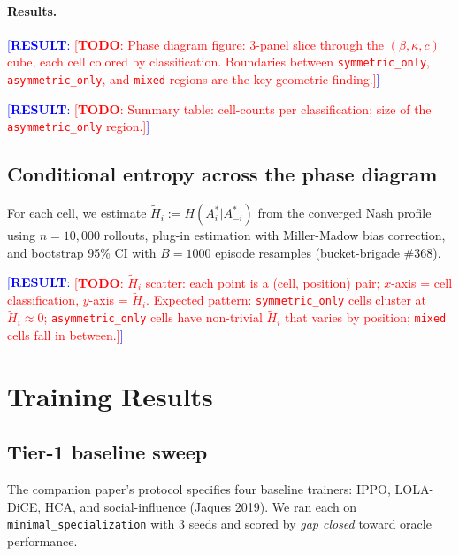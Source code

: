 \documentclass{article}
\newcommand{\TODO}[1]{\textcolor{red}{[\textbf{TODO}: #1]}}
\newcommand{\RESULT}[1]{\textcolor{blue}{[\textbf{RESULT}: #1]}}
\begin{document}
\paragraph{Results.}
\RESULT{\TODO{Phase diagram figure: 3-panel slice through the
$(\beta, \kappa, c)$ cube, each cell colored by classification.  Boundaries
between \texttt{symmetric\_only}, \texttt{asymmetric\_only}, and \texttt{mixed}
regions are the key geometric finding.}}

\RESULT{\TODO{Summary table: cell-counts per classification; size of the
\texttt{asymmetric\_only} region.}}

\subsection{Conditional entropy across the phase diagram}
\label{sec:cond-entropy}

For each cell, we estimate $\tilde{H}_i := H(A_i^*|A_{-i}^*)$ from the
converged Nash profile using $n = 10{,}000$ rollouts, plug-in estimation with
Miller-Madow bias correction, and bootstrap 95\% CI with $B = 1000$ episode
resamples (bucket-brigade
\href{https://github.com/rjwalters/bucket-brigade/issues/368}{\#368}).

\RESULT{\TODO{$\tilde{H}_i$ scatter: each point is a (cell, position) pair;
$x$-axis = cell classification, $y$-axis = $\tilde{H}_i$.  Expected pattern:
\texttt{symmetric\_only} cells cluster at $\tilde{H}_i \approx 0$;
\texttt{asymmetric\_only} cells have non-trivial $\tilde{H}_i$ that varies by
position; \texttt{mixed} cells fall in between.}}

\section{Training Results}
\label{sec:training}

\subsection{Tier-1 baseline sweep}

The companion paper's protocol specifies four baseline trainers: IPPO, LOLA-DiCE,
HCA, and social-influence (Jaques 2019).  We ran each on \texttt{minimal\_specialization}
with 3 seeds and scored by \emph{gap closed} toward oracle performance.
\end{document}
